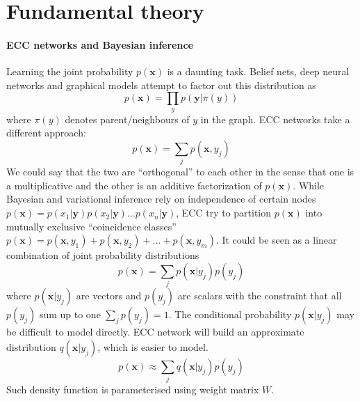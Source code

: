 \documentclass[12pt]{article}
\begin{document}
\section{Fundamental theory}

\paragraph{ECC networks and Bayesian inference}  Learning the joint probability $p(\boldsymbol{x})$ is a daunting task. Belief nets, deep neural networks and graphical models attempt to factor out this distribution as
\[
p(\boldsymbol{x})=\prod_{y} p(\boldsymbol{y}|\pi(y))
\]
where $\pi(y)$ denotes parent/neighbours of $y$ in the graph. ECC networks take a different approach: 
\[
p(\boldsymbol{x})=\sum_{j} p(\boldsymbol{x},y_j)
\]
We could say that the two are ``orthogonal'' to each other in the sense that one is a multiplicative and the other is an additive factorization of $p(\boldsymbol{x})$.  While Bayesian and variational inference rely on independence of certain nodes $p(\boldsymbol{x})=p(x_1|\boldsymbol{y})p(x_2|\boldsymbol{y})...p(x_n|\boldsymbol{y})$, ECC try to partition $p(\boldsymbol{x})$ into mutually exclusive ``coincidence classes''
$p(\boldsymbol{x})=p(\boldsymbol{x},y_1)+p(\boldsymbol{x},y_2)+...+p(\boldsymbol{x},y_m)$. It could be seen as a linear combination of joint probability distributions
\[
p(\boldsymbol{x})=\sum_{j} p(\boldsymbol{x}|y_j) p(y_j)
\]
where $p(\boldsymbol{x}|y_j)$ are vectors and $p(y_j)$ are scalars with the constraint that all  $p(y_j)$ sum up to one $\sum_{j} p(y_j)=1$. The conditional probability $p(\boldsymbol{x}|y_j)$  may be difficult  to model directly. ECC network will build an approximate distribution $q(\boldsymbol{x}|y_j)$, which is easier to model. 
\[
p(\boldsymbol{x})\approx\sum_{j} q(\boldsymbol{x}|y_j) p(y_j)
\]
Such density function is parameterised using weight matrix $W$.
\end{document}
